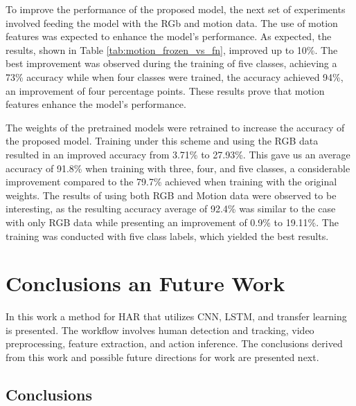 \documentclass[mathematics,article,submit,pdftex,moreauthors]{Definitions/mdpi}
\begin{document}
To improve the performance of the proposed model, the next set of experiments involved feeding the model with the RGb and motion data. The use of motion features was expected to enhance the model's performance. As expected, the results, shown in Table \ref{tab:motion_frozen_vs_fn}, improved up to 10\%. The best improvement was observed during the training of five classes, achieving a 73\% accuracy while when four classes were trained, the accuracy achieved 94\%, an improvement of four percentage points. These results prove that motion features enhance the model's performance.

The weights of the pretrained models were retrained to increase the accuracy of the proposed model. Training under this scheme and using the RGB data resulted in an improved accuracy from 3.71\% to 27.93\%. This gave us an average accuracy of 91.8\% when training with three, four, and five classes, a considerable improvement compared to the 79.7\% achieved when training with the original weights. The results of using both RGB and Motion data were observed to be interesting, as the resulting accuracy average of 92.4\% was similar to the case with only RGB data while presenting an improvement of 0.9\% to 19.11\%. The training was conducted with five class labels, which yielded the best results.

\section{Conclusions an Future Work}
In this work a method for HAR that utilizes CNN, LSTM, and transfer learning is presented. The workflow involves human detection and tracking, video preprocessing, feature extraction, and action inference. The conclusions derived from this work and possible future directions for work are presented next. 

\subsection{Conclusions}
\end{document}
